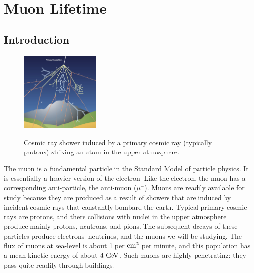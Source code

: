 \chapter{Muon Lifetime}

\section{Introduction}

\begin{figure}[htbp]
\begin{center}
{\includegraphics[width=0.35\textwidth]{figs/muon/cosmic_ray.jpg}}\\
\end{center}
\caption{\label{fig:cosmic}  Cosmic ray shower induced by a primary cosmic ray (typically protons) striking an atom in the upper atmosphere.}\end{figure}

The muon is a fundamental particle in the Standard Model of particle physics.  It is essentially a heavier version of the electron.  Like the electron, the muon has a corresponding anti-particle, the anti-muon ($\mu^+$).  Muons are readily available for study because they are produced as a result of showers that are induced by incident cosmic rays that constantly bombard the earth.  Typical primary cosmic rays are protons, and there collisions with nuclei in the upper atmosphere produce mainly protons, neutrons, and pions.  The subsequent decays of these particles produce electrons, neutrinos, and the muons we will be studying.  The flux of muons at sea-level is about 1 per ${\rm cm}^2$ per minute, and this population has a mean kinetic energy of about $4~\rm GeV$.  Such muons are highly penetrating:  they pass quite readily through buildings.

